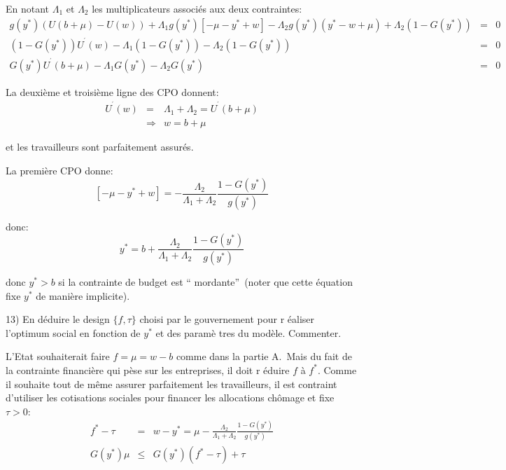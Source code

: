 \documentclass[a4paper]{article}
\begin{document}
En notant $\Lambda _{1}$ et $\Lambda _{2}$ les multiplicateurs associ\'{e}s
aux deux contraintes:%
\begin{eqnarray*}
g(y^{\ast })\left( U(b+\mu )-U(w)\right) +\Lambda _{1}g(y^{\ast })\left[
-\mu -y^{\ast }+w\right] -\Lambda _{2}g(y^{\ast })(y^{\ast }-w+\mu )+\Lambda
_{2}(1-G(y^{\ast })) &=&0 \\
\left( 1-G(y^{\ast })\right) U^{^{\prime }}(w)-\Lambda _{1}\left(
1-G(y^{\ast })\right) -\Lambda _{2}\left( 1-G(y^{\ast })\right) &=&0 \\
G(y^{\ast })U^{^{\prime }}(b+\mu )-\Lambda _{1}G(y^{\ast })-\Lambda
_{2}G(y^{\ast }) &=&0
\end{eqnarray*}

La deuxi\`{e}me et troisi\`{e}me ligne des CPO donnent:%
\begin{eqnarray*}
U^{^{\prime }}(w) &=&\Lambda _{1}+\Lambda _{2}=U^{^{\prime }}(b+\mu ) \\
&\Rightarrow &w=b+\mu
\end{eqnarray*}

et les travailleurs sont parfaitement assur\'{e}s.

La premi\`{e}re CPO donne:%
\begin{equation*}
\left[ -\mu -y^{\ast }+w\right] =-\frac{\Lambda _{2}}{\Lambda _{1}+\Lambda
_{2}}\frac{1-G(y^{\ast })}{g(y^{\ast })}
\end{equation*}

donc:%
\begin{equation*}
y^{\ast }=b+\frac{\Lambda _{2}}{\Lambda _{1}+\Lambda _{2}}\frac{1-G(y^{\ast
})}{g(y^{\ast })}
\end{equation*}

donc $y^{\ast }>b$ si la contrainte de budget est \textquotedblleft
mordante\textquotedblright\ (noter que cette \'{e}quation fixe $y^{\ast }$
de mani\`{e}re implicite).

\bigskip

13) En d\'{e}duire le design $\{f,\tau \}$ choisi par le gouvernement pour r%
\'{e}aliser l'optimum social en fonction de $y^{\ast }$ et des param\`{e}%
tres du mod\`{e}le. Commenter.

\bigskip

L'Etat souhaiterait faire $f=\mu =w-b$ comme dans la partie A.\ Mais du fait
de la contrainte financi\`{e}re qui p\`{e}se sur les entreprises, il doit r%
\'{e}duire $f$ \`{a} $f^{\ast }$. Comme il souhaite tout de m\^{e}me assurer
parfaitement les travailleurs, il est contraint d'utiliser les cotisations
sociales pour financer les allocations ch\^{o}mage et fixe $\tau >0$:%
\begin{eqnarray*}
f^{\ast }-\tau &=&w-y^{\ast }=\mu -\frac{\Lambda _{2}}{\Lambda _{1}+\Lambda
_{2}}\frac{1-G(y^{\ast })}{g(y^{\ast })} \\
G(y^{\ast })\mu &\leq &G(y^{\ast })\left( f^{\ast }-\tau \right) +\tau
\end{eqnarray*}
\end{document}

